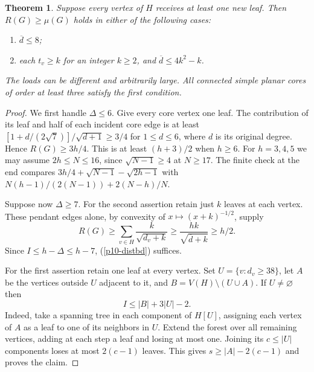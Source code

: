 \documentclass[11pt,a4paper]{article}
\newtheorem{theorem}{Theorem}[section]
\newcommand{\dd}{\overline d}\newcommand{\pos}[1]{(#1)_+}
\begin{document}
\begin{theorem}\label{p10-covers}
Suppose every vertex of $H$ receives at least one new leaf. Then
$R(G)\ge\mu(G)$ holds in either of the following cases:
\begin{enumerate}
\item $\dd\le8$;
\item each $t_v\ge k$ for an integer $k\ge2$, and $\dd\le4k^2-k$.
\end{enumerate}
The loads can be different and arbitrarily large. All connected simple
planar cores of order at least three satisfy the first condition.
\end{theorem}
\begin{proof}
We first handle $\Delta\le6$. Give every core vertex one leaf.
The contribution of its leaf and half of each incident core edge is at
least $[1+d/(2\sqrt7)]/\sqrt{d+1}\ge3/4$ for $1\le d\le6$, where $d$
is its original degree. Hence $R(G)\ge3h/4$. This is at least
$(h+3)/2$ when $h\ge6$. For $h=3,4,5$ we may assume $2h\le N\le16$,
since $\sqrt{N-1}\ge4$ at $N\ge17$. The finite check at the end compares
$3h/4+\sqrt{N-1}-\sqrt{2h-1}$ with
$N(h-1)/(2(N-1))+2(N-h)/N$.

Suppose now $\Delta\ge7$. For the second assertion retain just $k$ leaves
at each vertex. These pendant edges alone, by convexity of
$x\mapsto(x+k)^{-1/2}$, supply
\[
 R(G)\ge\sum_{v\in H}\frac{k}{\sqrt{d_v+k}}
 \ge\frac{hk}{\sqrt{\dd+k}}\ge h/2 .
\]
Since $I\le h-\Delta\le h-7$, (\ref{p10-distbd}) suffices.

For the first assertion retain one leaf at every vertex. Set
$U=\{v:d_v\ge38\}$, let $A$ be the vertices outside $U$ adjacent to it,
and $B=V(H)\setminus(U\cup A)$. If $U\ne\varnothing$ then
\[
 I\le |B|+3|U|-2 .
\]
Indeed, take a spanning tree in each component of $H[U]$, assigning each
vertex of $A$ as a leaf to one of its neighbors in $U$. Extend the forest
over all remaining vertices, adding at each step a leaf and losing at most
one. Joining its $c\le |U|$ components loses at most $2(c-1)$ leaves.
This gives $s\ge |A|-2(c-1)$ and proves the claim.


\end{proof}
\end{document}
